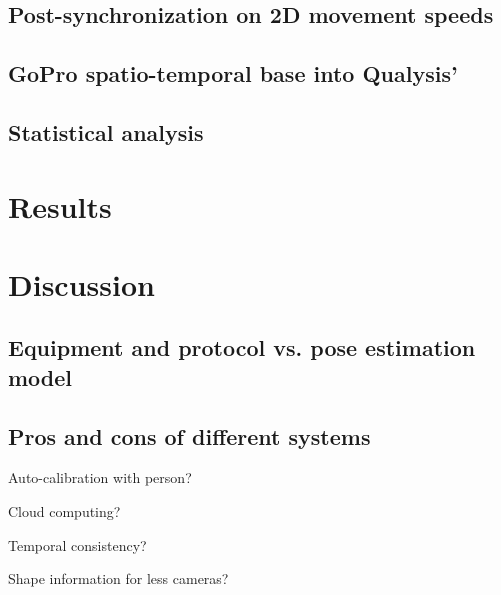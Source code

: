 \subsection{Post-synchronization on 2D movement speeds}
\blindtext

\subsection{GoPro spatio-temporal base into Qualysis'}
\blindtext

\subsection{Statistical analysis}
\blindtext


\section{Results}
\blindtext


\section{Discussion}
\subsection{Equipment and protocol vs. pose estimation model}
\blindtext

\subsection{Pros and cons of different systems}

Auto-calibration with person?

Cloud computing?

Temporal consistency?

Shape information for less cameras?

\blindtext
